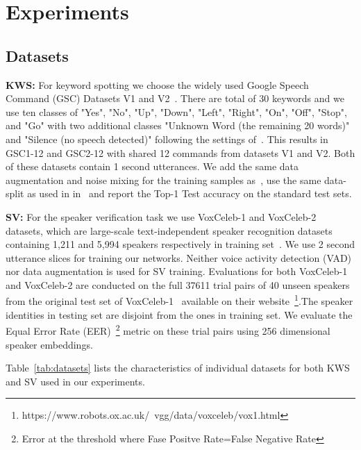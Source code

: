 \documentclass{article}
\begin{document}
\section{Experiments}
\subsection{Datasets}

\noindent \textbf{KWS:} For keyword spotting we choose the widely used Google Speech Command (GSC) Datasets V1 and V2~\cite{warden2018speech}. 
There are total of 30 keywords and we use ten classes of "Yes", "No", "Up", "Down", "Left", "Right", "On", "Off", "Stop",
and "Go" with two additional classes "Unknown Word (the remaining 20 words)" and "Silence (no speech detected)" following the settings of~\cite{qualcommkwssota,seo2021wav2kws}.
This results in GSC1-12 and GSC2-12 with shared 12 commands from datasets V1 and V2. Both of these datasets contain 1 second utterances.
We add the same data augmentation and noise mixing for the training samples as~\cite{seo2021wav2kws}, use the same data-split as used in in~\cite{qualcommkwssota,warden2018speech,seo2021wav2kws} and report the Top-1 Test accuracy on the standard test sets.



\noindent \textbf{SV:} For the speaker verification task we use VoxCeleb-1 and VoxCeleb-2 datasets, which are large-scale text-independent speaker recognition datasets containing 1,211 and 5,994 speakers respectively in training set~\cite{voxcelebwildjournal,nagrani2017voxceleb}. We use 2 second utterance slices for training our networks. Neither voice activity detection (VAD) nor data augmentation is used for SV training. 
Evaluations for both VoxCeleb-1 and VoxCeleb-2 are conducted on the full 37611 trial pairs of 40 unseen speakers from the original test set of VoxCeleb-1~\cite{voxcelebwildjournal} available on their website~\footnote{https://www.robots.ox.ac.uk/~vgg/data/voxceleb/vox1.html}.The speaker identities in testing set are disjoint from the ones in training set. We evaluate the Equal Error Rate (EER)~\footnote{Error at the threshold where Fase Positve Rate=False Negative Rate} metric on these trial pairs using 256 dimensional speaker embeddings.

Table~\ref{tab:datasets} lists the characteristics of individual datasets for both KWS and SV used in our experiments. 
\end{document}
